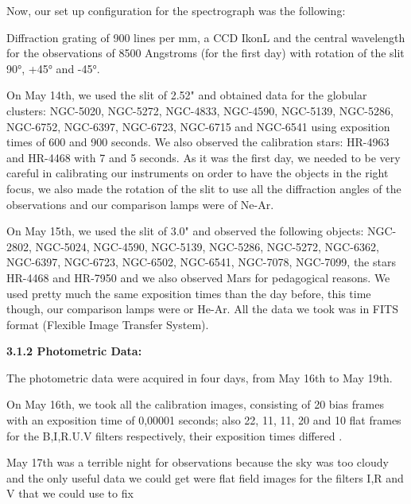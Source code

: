 \documentclass[english]{article}
\begin{document}
Now, our set up configuration for the spectrograph was the following:

Diffraction grating of 900 lines per mm, a CCD IkonL and the central wavelength for the observations of 8500 Angstroms (for the first day) with rotation of the slit 90°, +45° and -45°.

On May 14th, we used the slit of 2.52" and obtained data for the globular clusters: NGC-5020, NGC-5272, NGC-4833, NGC-4590, NGC-5139, NGC-5286, NGC-6752, NGC-6397, NGC-6723, NGC-6715 and NGC-6541 using exposition times of 600 and 900 seconds. We also observed the calibration stars: HR-4963 and HR-4468 with 7 and 5 seconds. As it was the first day, we needed to be very careful in calibrating our instruments on order to have the objects in the right focus, we also made the rotation of the slit to use all the diffraction angles of the observations and our comparison lamps were of Ne-Ar.

On May 15th, we used the slit of 3.0" and observed the following objects: NGC-2802, NGC-5024, NGC-4590, NGC-5139, NGC-5286, NGC-5272, NGC-6362, NGC-6397, NGC-6723, NGC-6502, NGC-6541, NGC-7078, NGC-7099, the stars HR-4468 and HR-7950 and we also observed Mars for pedagogical reasons. We used pretty much the same exposition times than the day before, this time though, our comparison lamps were or He-Ar. All the data we took was in FITS format (Flexible Image Transfer System).

\textbf{{\large 3.1.2 Photometric Data:}}

The photometric data were acquired in four days, from May 16th to May 19th. 

On May 16th, we took all the calibration images, consisting of 20 bias frames with an exposition time of 0,00001 seconds; also 22, 11, 11, 20 and 10 flat frames for the B,I,R.U.V filters respectively, their exposition times differed . 

May 17th was a terrible night for observations because the sky was too cloudy and the only useful data we could get were flat field images for the filters I,R and V that we could use to fix 
\end{document}
